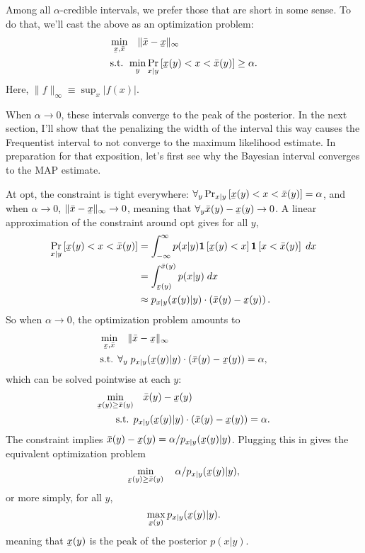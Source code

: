 \documentclass{article}
\newcommand{\xl}{\underaccent{\bar}{x}}
\newcommand{\xh}{\bar{x}}
\newcommand{\1}{\mathbf{1}}
\begin{document}
Among all $\alpha$-credible intervals, we prefer those that are short in some
sense. To do that, we'll cast the above as an optimization problem:
\begin{align}\label{eq:bayes-interval}
\min_{\xl, \xh} &\quad  \| \xh - \xl \|_\infty \\
\text{s.t. } & \min_y \Pr_{x|y}\left[\xl(y) < x < \xh(y)\right] \geq \alpha.
\end{align}
Here, $\|f\|_\infty \equiv \sup_x |f(x)|$.

When $\alpha\to 0$, these intervals converge to the peak of the posterior. In
the next section, I'll show that the penalizing the width of the interval this
way causes the Frequentist interval to not converge to the maximum likelihood
estimate. In preparation for that exposition, let's first see why the Bayesian
interval converges to the MAP estimate.

At opt, the constraint is tight everywhere: $\forall_y
\Pr_{x|y}\left[\xl(y) < x < \xh(y)\right] = \alpha$, and when $\alpha\to 0$,
$\| \xh - \xl \|_\infty \to 0$, meaning that $\forall_y \xh(y) - \xl(y) \to 0$.
A linear approximation of the constraint around opt gives for all $y$,
\begin{align}
        \Pr_{x|y}\left[\xl(y) < x < \xh(y)\right] &= \int_{-\infty}^\infty p(x|y) \1\left[ \xl(y) < x\right] \1\left[x < \xh(y)\right] \;dx\\
        &= \int_{\xl(y)}^{\xh(y)} p(x|y) \;dx\\
        &\approx p_{x|y}(\xl(y) | y) \cdot \left(\xh(y)-\xl(y)\right).
\end{align}
So when $\alpha\to 0$, the optimization problem amounts to
\begin{align}
\min_{\xl, \xh} &\quad  \| \xh - \xl \|_\infty \\
        \text{s.t. } & \forall_y\; p_{x|y}(\xl(y) | y) \cdot \left(\xh(y)-\xl(y)\right) =\alpha,
\end{align}
which can be solved pointwise at each $y$:
\begin{align}
        \min_{\xl(y)\geq \xh(y)} &\quad  \xh(y)-\xl(y) \\
        \text{s.t. } & p_{x|y}(\xl(y) | y) \cdot \left(\xh(y)-\xl(y)\right) =\alpha.
\end{align}
The constraint implies $\xh(y)-\xl(y) = \alpha / p_{x|y}(\xl(y) | y) $. Plugging this in gives the equivalent optimization problem
\[
        \min_{\xl(y)\geq \xh(y)} \quad  \alpha / p_{x|y}(\xl(y) | y),
\]
or more simply, for all $y$,
\[
        \max_{\xl(y)}  p_{x|y}(\xl(y) | y).
\]
meaning that $\xl(y)$ is the peak of the posterior $p(x|y)$.
\end{document}
